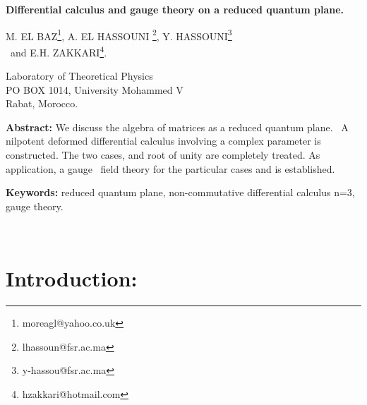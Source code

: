 \documentclass[a4paper,12pt,thmsa]{article}
\begin{document}
\begin{center}
{\LARGE \textbf{\coordHE{} Differential calculus and gauge theory on a reduced
quantum plane.}}\\[0pt]\vspace{1cm}

\vspace{0.5cm}

\vspace{0.5cm}

{\large M. EL BAZ\footnote{{\large moreagl@yahoo.co.uk}}, A. EL HASSOUNI
\footnote{{\large lhassoun@fsr.ac.ma}}, Y. HASSOUNI\footnote{{\large %
y-hassou@fsr.ac.ma}}\\ \ and E.H. ZAKKARI\footnote{{\large %
hzakkari@hotmail.com}}.}\\[0pt]\vspace{0.5cm}\vspace{0.5cm}

Laboratory of Theoretical Physics\\[0pt]PO BOX 1014, University Mohammed V %
\\[0pt]Rabat, Morocco.
\end{center}

\bigskip

\vspace {2cm}

\textbf{Abstract:} We discuss the algebra of \coordHE{} matrices as a
reduced quantum plane. \ A \coordHE{}nilpotent deformed differential calculus
involving a complex parameter \coordHE{} is constructed. The two cases, \coordHE{}  \coordHE{}
and \coordHE{} root of unity are completely treated. As application, a gauge \
field theory for the particular cases \coordHE{} and \coordHE{} is established.\

\vspace {2cm}

\textbf{Keywords:} reduced quantum plane, non-commutative differential
calculus n=3, gauge theory.

\newpage\

\section{Introduction:}
\end{document}
